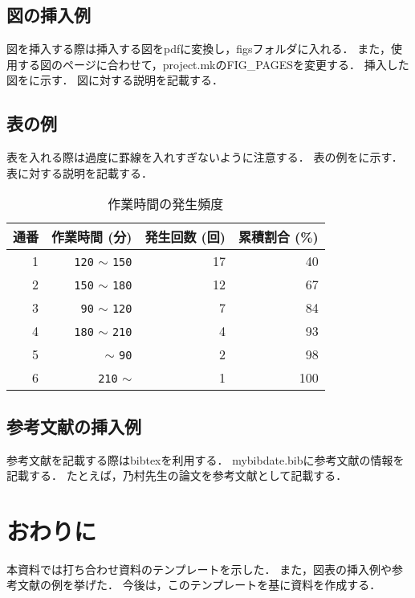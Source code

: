 \documentclass[12pt]{jsarticle}
\begin{document}
\subsection{図の挿入例}
図を挿入する際は挿入する図をpdfに変換し，figsフォルダに入れる．
また，使用する図のページに合わせて，project.mkのFIG\_PAGESを変更する．
挿入した図をに示す．
図に対する説明を記載する．


\subsection{表の例}
表を入れる際は過度に罫線を入れすぎないように注意する．
表の例をに示す．
表に対する説明を記載する．

\begin{table}[tb]
  \begin{center}
    \caption{作業時間の発生頻度}\label{tab:time_range_ratio}
    \begin{tabular}{r|r|r|r}
      \hline\hline
      \multicolumn{1}{l|}{通番} & \multicolumn{1}{l|}{作業時間 (分)} & \multicolumn{1}{l|}{発生回数 (回)} & \multicolumn{1}{l}{累積割合 (\%)}\\
      \hline
      1 & {\texttt{120}} $\sim$ {\texttt{150}} & 17 & 40\\
      2 & {\texttt{150}} $\sim$ {\texttt{180}} & 12 & 67\\
      3 & {\texttt{90}} $\sim$ {\texttt{120}} & 7 & 84\\
      4 & {\texttt{180}} $\sim$ {\texttt{210}} & 4 & 93\\
      5 & $\sim$ {\texttt{90}} & 2 & 98\\
      6 & {\texttt{210}} $\sim$ & 1 & 100\\
      \hline
    \end{tabular}
  \end{center}
\end{table}

\subsection{参考文献の挿入例}
参考文献を記載する際はbibtexを利用する．
mybibdate.bibに参考文献の情報を記載する．
たとえば，乃村先生の論文\cite{nom2011c}を参考文献として記載する．

\section{おわりに}
\label{sec:conclusion}
本資料では打ち合わせ資料のテンプレートを示した．
また，図表の挿入例や参考文献の例を挙げた．
今後は，このテンプレートを基に資料を作成する．



\end{document}

